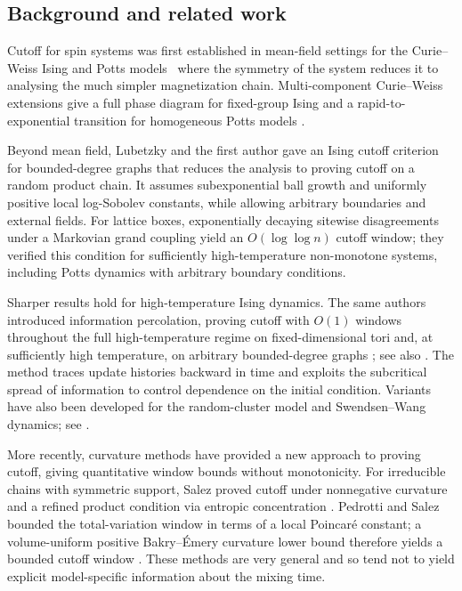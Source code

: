 \documentclass[letterpaper,11pt,reqno]{amsart}
\theoremstyle{definition}
\begin{document}
\subsection{Background and related work}
Cutoff for spin systems was first established in mean-field settings for the Curie--Weiss Ising and Potts models~\cites{IsingMeanfield,PottsMeanfield} where the symmetry of the system reduces it to analysing the much simpler magnetization chain.
{Multi-component Curie--Weiss extensions give a full phase diagram for fixed-group Ising and a rapid-to-exponential transition for homogeneous Potts models \cites{MultiIsing,MultiPotts}.}


Beyond mean field, Lubetzky and the first author gave an Ising cutoff criterion for bounded-degree graphs \cite{CutoffSpin} that reduces the analysis to proving cutoff on a random product chain. It assumes subexponential ball growth and uniformly positive local log-Sobolev constants, while allowing arbitrary boundaries and external fields. For lattice boxes, exponentially decaying sitewise disagreements under a Markovian grand coupling yield an \(O(\log\log n)\) cutoff window; they verified this condition for sufficiently high-temperature non-monotone systems, including Potts dynamics with arbitrary boundary conditions.


Sharper results hold for high-temperature Ising dynamics. The same authors introduced information percolation, proving cutoff with \(O(1)\) windows throughout the full high-temperature regime on fixed-dimensional tori and, at sufficiently high temperature, on arbitrary bounded-degree graphs \cites{StochasticIP,Universality}; see also \cite{Exposition}. The method traces update histories backward in time and exploits the subcritical spread of information to control dependence on the initial condition. Variants have also been developed for the random-cluster model and Swendsen--Wang dynamics; see \cite{RCM,SW}.



More recently, curvature methods have provided a new approach to proving cutoff, giving quantitative window bounds without monotonicity.
For irreducible chains with symmetric support, Salez proved cutoff under nonnegative curvature and a refined product condition via entropic concentration \cite{SalezCurvature}.
Pedrotti and Salez bounded the total-variation window in terms of a local Poincar\'e constant; a volume-uniform positive Bakry--\'Emery curvature lower bound therefore yields a bounded cutoff window \cite{PedrottiSalezLocalProduct}.
These methods are very general and so tend not to yield explicit model-specific information about the mixing time.
\end{document}
